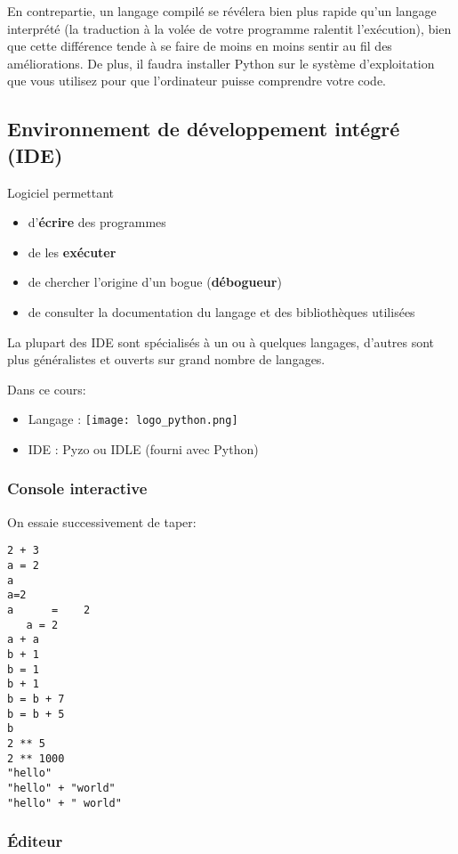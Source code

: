 En contrepartie, un langage compilé se révélera bien plus rapide qu'un langage interprété (la traduction à la volée de votre programme ralentit l'exécution), bien que cette différence tende à se faire de moins en moins sentir au fil des améliorations. De plus, il faudra installer Python sur le système d'exploitation que vous utilisez pour que l'ordinateur puisse comprendre votre code.


\subsection{Environnement de développement intégré (IDE)}
Logiciel permettant
\begin{itemize}
\item d'\textbf{écrire} des programmes
\item de les \textbf{exécuter}
\item de chercher l'origine d'un bogue (\textbf{débogueur})
\item de consulter la documentation du langage et des bibliothèques utilisées
\end{itemize}

La plupart des IDE sont spécialisés à un ou à quelques langages,
d'autres sont plus généralistes et ouverts sur grand nombre de
langages.


Dans ce cours:
\begin{itemize}
\item Langage : \texttt{[image: logo\_python.png]}
\item IDE : Pyzo ou IDLE (fourni avec Python)
\end{itemize}


\subsubsection{Console interactive}

On essaie successivement de taper:
\begin{multicols}{2}
\begin{lstlisting}
2 + 3
a = 2
a
a=2
a      =    2
   a = 2
a + a
b + 1
b = 1
b + 1
b = b + 7
b = b + 5
b
2 ** 5
2 ** 1000
"hello"
"hello" + "world"
"hello" + " world"
\end{lstlisting}
\end{multicols}
%
\subsubsection{Éditeur}

